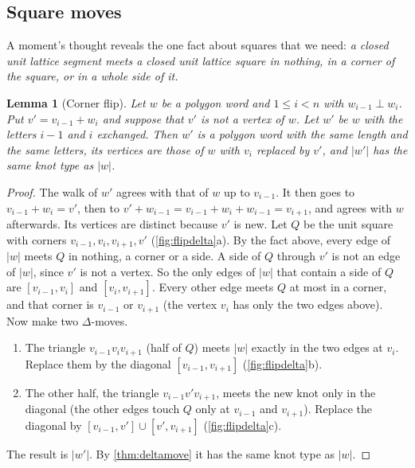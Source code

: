 \documentclass[11pt]{article}
\theoremstyle{plain}
\newtheorem{lemma}[theorem]{Lemma}
\theoremstyle{definition}
\theoremstyle{remark}
\begin{document}
\subsection{Square moves}

A moment's thought reveals the one fact about squares that we need: \emph{a closed unit lattice segment
meets a closed unit lattice square in nothing, in a corner of the square, or in a whole side of it.}


\begin{lemma}[Corner flip]\label{lem:flip}
Let $w$ be a polygon word and $1\le i<n$ with $w_{i-1}\perp w_i$. Put $v'=v_{i-1}+w_i$ and suppose that
$v'$ is not a vertex of $w$. Let $w'$ be $w$ with the letters $i-1$ and $i$ exchanged. Then $w'$ is a
polygon word with the same length and the same letters, its vertices are those of $w$ with $v_i$
replaced by $v'$, and $|w'|$ has the same knot type as $|w|$.
\end{lemma}
\begin{proof}
The walk of $w'$ agrees with that of $w$ up to $v_{i-1}$. It then goes to $v_{i-1}+w_i=v'$, then to
$v'+w_{i-1}=v_{i-1}+w_i+w_{i-1}=v_{i+1}$, and agrees with $w$ afterwards. Its vertices are distinct
because $v'$ is new. Let $Q$ be the unit square with corners $v_{i-1},v_i,v_{i+1},v'$
(\cref{fig:flipdelta}a). By the fact above, every edge of $|w|$ meets $Q$ in nothing, a corner or
a side. A side of $Q$ through $v'$ is not an edge of $|w|$, since $v'$ is not a vertex. So the only
edges of $|w|$ that contain a side of $Q$ are $[v_{i-1},v_i]$ and $[v_i,v_{i+1}]$. Every other edge
meets $Q$ at most in a corner, and that corner is $v_{i-1}$ or $v_{i+1}$ (the vertex $v_i$ has only the
two edges above). Now make two $\Delta$-moves.
\begin{enumerate}
\item The triangle $v_{i-1}v_iv_{i+1}$ (half of $Q$) meets $|w|$ exactly in the two edges at $v_i$. Replace
them by the diagonal $[v_{i-1},v_{i+1}]$ (\cref{fig:flipdelta}b).
\item The other half, the triangle $v_{i-1}v'v_{i+1}$, meets the new knot only in the diagonal (the
other edges touch $Q$ only at $v_{i-1}$ and $v_{i+1}$). Replace the diagonal by
$[v_{i-1},v']\cup[v',v_{i+1}]$ (\cref{fig:flipdelta}c).
\end{enumerate}
The result is $|w'|$. By \cref{thm:deltamove} it has the same knot type as $|w|$.
\end{proof}
\end{document}
